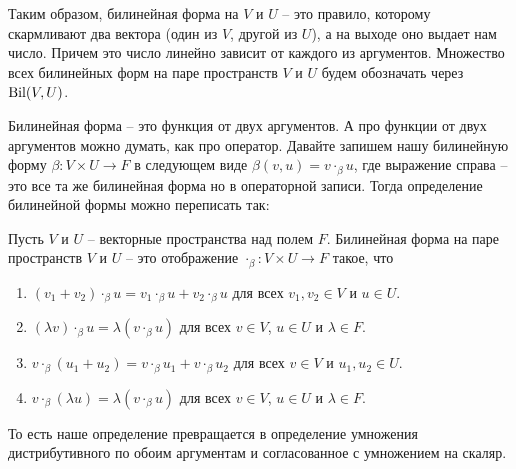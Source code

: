 Таким образом, билинейная форма на $V$ и $U$ -- это правило, которому скармливают два вектора (один из $V$, другой из $U$), а на выходе оно выдает нам число. Причем это число линейно зависит от каждого из аргументов. Множество всех билинейных форм на паре пространств $V$ и $U$ будем обозначать через $\operatorname{Bil}(V,U)$.

Билинейная форма -- это функция от двух аргументов. А про функции от двух аргументов можно думать, как про оператор. Давайте запишем нашу билинейную форму $\beta\colon V\times U \to F$ в следующем виде $\beta(v,u) = v \cdot_\beta u$, где выражение справа -- это все та же билинейная форма но в операторной записи. Тогда определение билинейной формы можно переписать так:
\begin{definition}
Пусть $V$ и $U$ -- векторные пространства над полем $F$. Билинейная форма на паре пространств $V$ и $U$ -- это отображение $\cdot_\beta\colon V\times U \to F$ такое, что
\begin{enumerate}
\item $(v_1 + v_2)\cdot_\beta u = v_1\cdot_\beta u + v_2\cdot_\beta u$ для всех $v_1,v_2\in V$ и $u\in U$.

\item $(\lambda v)\cdot_\beta u = \lambda (v\cdot_\beta u)$ для всех $v\in V$, $u\in U$ и $\lambda\in F$.

\item $v\cdot_\beta( u_1+u_2) = v\cdot_\beta u_1 + v\cdot_\beta u_2$ для всех $v\in V$ и $u_1,u_2\in U$.
\item $v\cdot_\beta(\lambda u) = \lambda (v\cdot_\beta u)$ для всех $v\in V$, $u\in U$ и $\lambda\in F$.
\end{enumerate}
\end{definition}

То есть наше определение превращается в определение умножения дистрибутивного по обоим аргументам и согласованное с умножением на скаляр.




